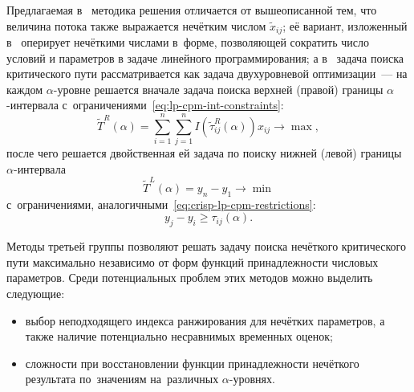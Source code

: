 Предлагаемая в~\cite{Indians_FCPM} методика решения отличается от вышеописанной тем, что величина потока также выражается нечётким числом $\tilde x_{ij}$; её вариант, изложенный в~\cite{Kumar_FCPM_Triangular} оперирует нечёткими числами в~форме, позволяющей сократить число условий и параметров в задаче линейного программирования; а в~\cite{Egyptians, Chen} задача поиска критического пути рассматривается как задача двухуровневой оптимизации~--- на каждом $\alpha$-уровне решается вначале задача поиска верхней (правой) границы $\alpha$-интервала с~ограничениями~\eqref{eq:lp-cpm-int-constraints}:
\begin{equation*}
  \tilde T^R \left( \alpha \right) = \sum \limits_{i=1}^{n} \sum \limits_{j=1}^{n} I\left(\tilde \tau_{ij}^R \left(\alpha \right) \right)x_{ij} \to \max,
\end{equation*}
после чего решается двойственная ей задача по поиску нижней (левой) границы $\alpha$-интервала
\begin{equation*}
  \tilde T^L \left( \alpha \right) = y_n-y_1 \to \min
\end{equation*}
с~ограничениями, аналогичными~\eqref{eq:crisp-lp-cpm-restrictions}:
\begin{equation*}
  y_j-y_i \geqslant \tau_{ij}\left( \alpha \right).
\end{equation*}

Методы третьей группы позволяют решать задачу поиска нечёткого критического пути максимально независимо от форм функций принадлежности числовых параметров. Среди потенциальных проблем этих методов можно выделить следующие:
\begin{itemize}
  \item выбор неподходящего индекса ранжирования для нечётких параметров, а также наличие потенциально несравнимых временных оценок;
  \item сложности при восстановлении функции принадлежности нечёткого результата по~значениям на~различных $\alpha$-уровнях.
\end{itemize}